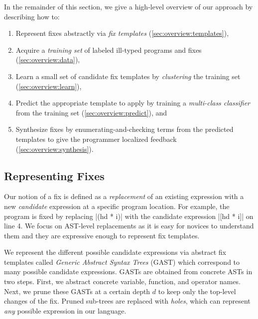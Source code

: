 In the remainder of this section, we give a high-level overview of our approach
by describing how to:

\begin{enumerate}

  \item Represent fixes abstractly via \emph{fix templates}
        (\autoref{sec:overview:templates}),

  \item Acquire a \emph{training set} of labeled ill-typed programs and fixes
        (\autoref{sec:overview:data}),

  \item Learn a small set of candidate fix templates by \emph{clustering}
        the training set (\autoref{sec:overview:learn}),

  \item Predict the appropriate template to apply by training a
        \emph{multi-class classifier} from the training set
        (\autoref{sec:overview:predict}), and

  \item Synthesize fixes by enumerating-and-checking terms from the
        predicted templates to give the programmer localized feedback
        (\autoref{sec:overview:synthesis}).
\end{enumerate}

\subsection{Representing Fixes}
\label{sec:overview:templates}

Our notion of a fix is defined as a \emph{replacement} of an existing expression
with a new \emph{candidate} expression at a specific program location. For
example, the \mbd program is fixed by replacing |(hd * i)| with the candidate
expression |[hd * i]| on line 4. We focus on AST-level replacements as it is
easy for novices to understand them and they are expressive enough to represent fix
templates.


%
We represent the different possible candidate expressions via abstract fix
templates called \emph{Generic Abstract Syntax Trees} (GAST) which correspond to
many possible candidate expressions.
%
GASTs are obtained from concrete ASTs in two steps.
%
First, we abstract concrete variable, function, and operator names.
%
Next, we prune these GASTs at a certain depth $d$ to keep only the top-level
changes of the fix. Pruned sub-trees are replaced with \emph{holes}, which can
represent \emph{any} possible expression in our language.


